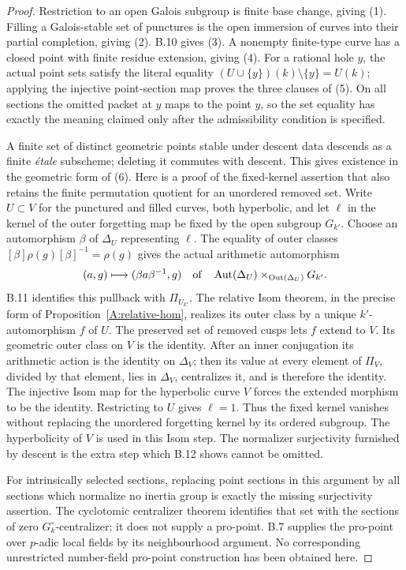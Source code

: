 \begin{proof}
Restriction to an open Galois subgroup is finite base change, giving
(1).  Filling a Galois-stable set of punctures is the open immersion
of curves into their partial completion, giving (2).  B.10 gives
(3).  A nonempty finite-type curve has a closed point with finite
residue extension, giving (4).
For a rational hole $y$, the actual point sets satisfy the literal
equality $(U\cup\{y\})(k)\setminus\{y\}=U(k)$; applying the
injective point-section map proves the three clauses of (5).
On all sections the omitted packet at $y$ maps to the point $y$,
so the set equality has exactly the meaning claimed only after the
admissibility condition is specified.

A finite set of distinct geometric points stable under descent data
descends as a finite \emph{\'etale} subscheme; deleting it commutes
with descent.  This gives existence in the geometric form of (6).
Here is a proof of the fixed-kernel assertion that also retains the
finite permutation quotient for an unordered removed set.  Write
$U\subset V$ for the punctured and filled curves, both hyperbolic,
and let $\ell$ in the kernel of the outer forgetting map be fixed
by the open subgroup $G_{k'}$.  Choose an automorphism $\beta$ of
$\Delta_U$ representing $\ell$.  The equality of outer classes
$[\beta]\rho(g)[\beta]^{-1}=\rho(g)$ gives the actual arithmetic
automorphism
\[
 (a,g)\longmapsto(\beta a\beta^{-1},g)
 \quad\hbox{of}\quad
 \operatorname{Aut}(\Delta_U)
       \times_{\operatorname{Out}(\Delta_U)}G_{k'}.
\]
B.11 identifies this pullback with $\Pi_{U_{k'}}$.
The relative Isom theorem, in the precise form of
Proposition~\ref{A:relative-hom}, realizes its outer class by a
unique $k'$-automorphism $f$ of $U$.  The preserved set of removed
cusps lets $f$ extend to $V$.  Its geometric outer class on $V$ is
the identity.  After an inner conjugation its arithmetic action
is the identity on $\Delta_V$; then its value at every element of
$\Pi_V$, divided by that element, lies in $\Delta_V$, centralizes it, and
is therefore the identity.  The injective Isom map for the
hyperbolic curve $V$ forces the extended morphism to be the
identity.  Restricting to $U$ gives $\ell=1$.
Thus the fixed kernel vanishes without replacing the unordered
forgetting kernel by its ordered subgroup.  The hyperbolicity of
$V$ is used in this Isom step.
The normalizer surjectivity furnished by descent is the extra step
which B.12 shows cannot be omitted.

For intrinsically selected sections, replacing point sections in this
argument by all sections which normalize no inertia group is exactly
the missing surjectivity assertion.  The cyclotomic centralizer
theorem identifies that set with the sections of zero
$G_k^\circ$-centralizer; it does not supply a pro-point.  B.7 supplies
the pro-point over $p$-adic local fields by its neighbourhood argument.
No corresponding unrestricted number-field pro-point construction
has been obtained here.
\end{proof}

